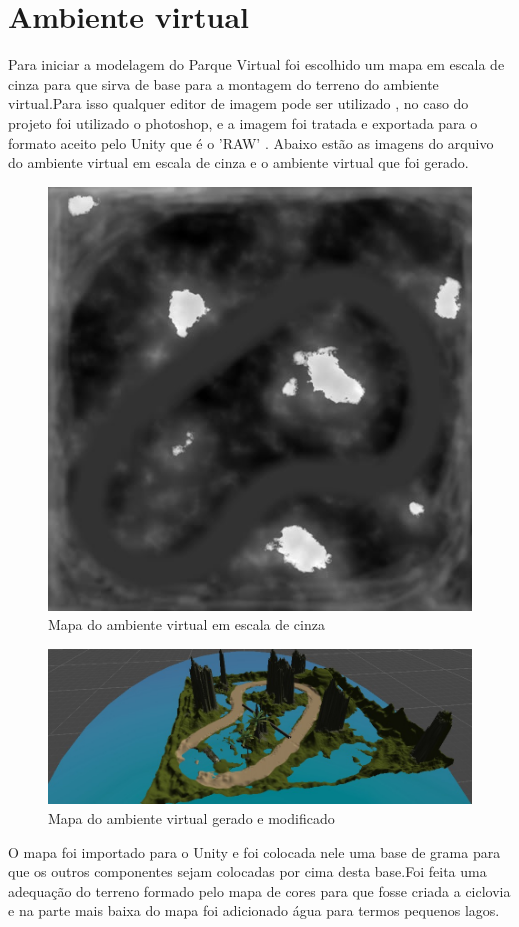 \section{Ambiente virtual}
	Para iniciar a modelagem do Parque Virtual foi escolhido um mapa em escala de 
cinza para que sirva de base para a montagem do terreno do ambiente virtual.Para isso 
qualquer editor de imagem pode ser utilizado , no caso do projeto foi utilizado o photoshop,
e a imagem foi tratada e exportada para o formato aceito pelo Unity que é o 'RAW' . Abaixo estão 
as imagens do arquivo do ambiente virtual em escala de cinza e o ambiente virtual que foi gerado.

\begin{figure}[htpb]
 \begin{center}
    \includegraphics[width=.40\textwidth]{figuras/mapa_escala_de_cinza.jpg}
 \end{center}
  \caption{Mapa do ambiente virtual em escala de cinza}
  \label{fig:core_concurrent}
\end{figure}

\begin{figure}[htpb]
 \begin{center}
    \includegraphics[width=.60\textwidth]{figuras/mapa.png}
 \end{center}
  \caption{Mapa do ambiente virtual gerado e modificado}
  \label{fig:core_concurrent}
\end{figure}

O mapa foi importado para o Unity e foi colocada nele uma base de grama para que
os outros componentes sejam colocadas por cima desta base.Foi feita uma adequação 
do terreno formado pelo mapa de cores para que fosse criada
a ciclovia e na parte mais baixa do mapa foi adicionado água para termos pequenos 
lagos.

